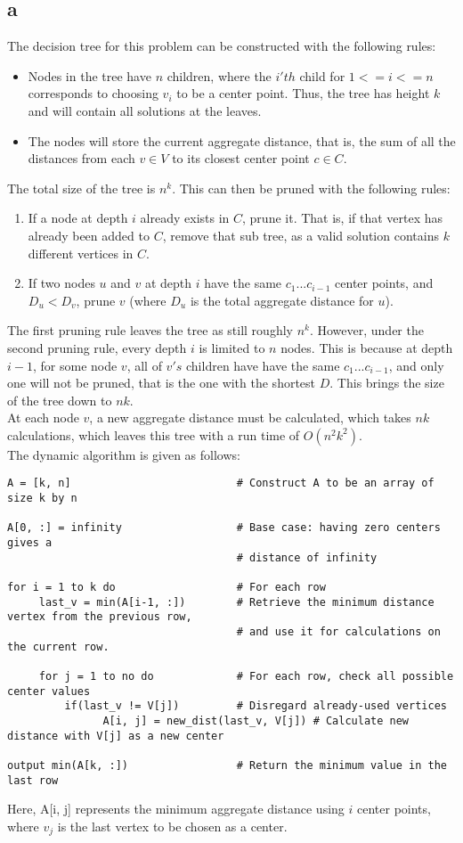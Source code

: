 \documentclass[letterpaper,notitlepage,twoside]{article}
\begin{document}
\subsection*{a}
The decision tree for this problem can be constructed with the following rules:
\begin{itemize}
\item Nodes in the tree have $n$ children, where the $i'th$ child for $1<=i<=n$ corresponds to choosing $v_i$ to be a center point. Thus, the tree has height $k$ and will contain all solutions at the leaves.
\item The nodes will store the current aggregate distance, that is, the sum of all the distances from each $v\in V$ to its closest center point $c\in C$.
\end{itemize}
The total size of the tree is $n^k$. This can then be pruned with the following rules:
\begin{enumerate}
\item If a node at depth $i$ already exists in $C$, prune it. That is, if that vertex has already been added to $C$, remove that sub tree, as a valid solution contains $k$ different vertices in $C$.
\item If two nodes $u$ and $v$ at depth $i$ have the same $c_1...c_{i-1}$ center points, and $D_u < D_v$, prune $v$ (where $D_u$ is the total aggregate distance for $u$).
\end {enumerate}
The first pruning rule leaves the tree as still roughly $n^k$. However, under the second pruning rule, every depth $i$ is limited to $n$ nodes. This is because at depth $i-1$, for some node $v$, all of $v's$ children have have the same $c_1...c_{i-1}$, and only one will not be pruned, that is the one with the shortest $D$. This brings the size of the tree down to $nk$.\\
At each node $v$, a new aggregate distance must be calculated, which takes $nk$ calculations, which leaves this tree with a run time of $O(n^2 k^2)$. \\
The dynamic algorithm is given as follows:
\begin{verbatim}
A = [k, n]                          # Construct A to be an array of size k by n

A[0, :] = infinity                  # Base case: having zero centers gives a
                                    # distance of infinity

for i = 1 to k do                   # For each row
     last_v = min(A[i-1, :])        # Retrieve the minimum distance vertex from the previous row,
                                    # and use it for calculations on the current row.

     for j = 1 to no do             # For each row, check all possible center values
         if(last_v != V[j])         # Disregard already-used vertices
               A[i, j] = new_dist(last_v, V[j]) # Calculate new distance with V[j] as a new center

output min(A[k, :])                 # Return the minimum value in the last row

\end{verbatim}
Here, A[i, j] represents the minimum aggregate distance using $i$ center points, where $v_j$ is the last vertex to be chosen as a center.
\end{document}

